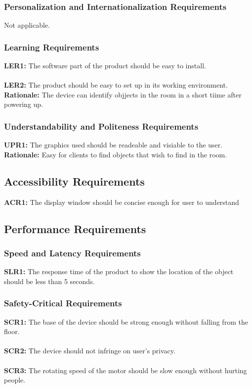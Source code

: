 \documentclass[12pt]{article}
\begin{document}
\subsubsection{Personalization and Internationalization Requirements}
Not applicable.
\subsubsection{Learning Requirements}
\textbf{LER1:} The software part of the product should be easy to install.\\\\
\textbf{LER2:} The product should be easy to set up in its working environment.\\
\textbf{Rationale:} The device can identify objjects in the room in a short tiime after powering up.
\subsubsection{Understandability and Politeness Requirements}
\textbf{UPR1:} The graphics used should be readeable and visiable to the user.\\
\textbf{Rationale:} Easy for clients to find objects that wish to find in the room.
\subsection{Accessibility Requirements}
\textbf{ACR1:} The display window should be concise enough for user to understand
\subsection{Performance Requirements}
\subsubsection{Speed and Latency Requirements}
\textbf{SLR1:} The response time of the product to show the location of the object should be less than 5 seconds.
\subsubsection{Safety-Critical Requirements}
\textbf{SCR1:} The base of the device should be strong enough without falling from the floor.\\\\
\textbf{SCR2:} The device should not infringe on user's privacy.\\\\
\textbf{SCR3:} The rotating speed of the motor should be slow enough without hurting people.
\end{document}
